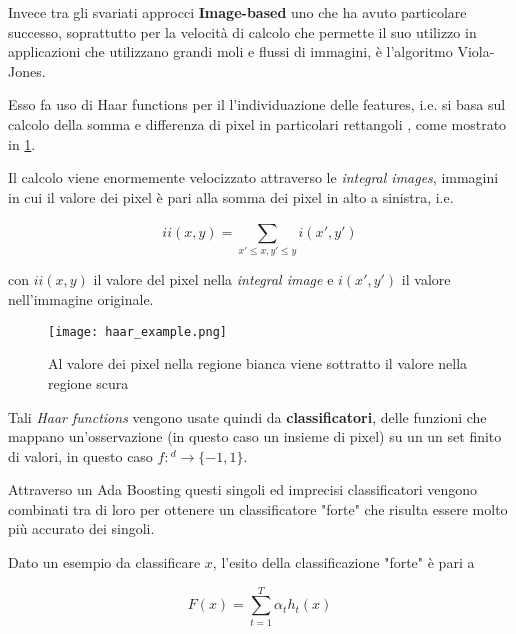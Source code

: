 Invece tra gli svariati approcci \textbf{Image-based} uno che ha avuto particolare successo, soprattutto per la 
velocità di calcolo che permette il suo utilizzo in applicazioni che utilizzano grandi 
moli e flussi di immagini, è l'algoritmo Viola-Jones.

\medskip

Esso fa uso di Haar functions per il l'individuazione delle features, i.e. 
si basa sul calcolo della somma e differenza di pixel in particolari rettangoli 
\cite{Viola2004}, come mostrato in \ref{fig:haar}.

Il calcolo viene enormemente velocizzato attraverso le \textit{integral images}, 
immagini in cui il valore dei pixel è pari alla somma dei pixel in alto a sinistra, i.e.

\begin{equation}
    ii(x,y) = \sum_{x'\leq x, y' \leq y}^{} i(x', y')
    \label{eq:}
\end{equation}

con $ii(x,y)$ il valore del pixel nella \textit{integral image} e $i(x',y')$ 
il valore nell'immagine originale.

\begin{figure}
    \begin{small}
        \begin{center}
            \texttt{[image: haar\_example.png]}
        \end{center}
        \caption{Al valore dei pixel nella regione bianca viene sottratto il valore nella regione scura}
        \label{fig:haar}
    \end{small}
\end{figure}

\medskip

Tali \textit{Haar functions} vengono usate quindi da \textbf{classificatori}, 
delle funzioni che mappano un'osservazione (in questo caso un insieme di pixel) su un un set finito di valori, 
in questo caso \cite{Wang2014}
$f:$\Rset$^d\rightarrow \{-1, 1\}$.

Attraverso un Ada Boosting questi singoli ed imprecisi classificatori vengono combinati tra di loro
per ottenere un classificatore "forte" che risulta essere molto più accurato \cite{Schapire2013} dei singoli.

Dato un esempio da classificare $x$, l'esito della classificazione "forte" è pari a 

\begin{equation}
    F(x) = \sum_{t=1}^{T} \alpha_t h_t(x)
    \label{eq:}
\end{equation}

